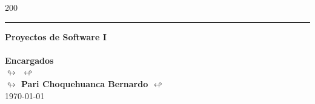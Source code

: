 \begin{titlepage}
\begin{textblock}{200}
\begin{center}
            \textcolor{azul}{\rule{0.5\linewidth}{0.80mm}} \par
            \vspace{4mm}
            
                
                {\large{\textbf{ Proyectos de Software I}}} \\[2pt]
                 {\large{\textbf{\textcolor{azul}{\Precidente }}}} \\[2pt]
                {\large{\textbf{Encargados}}}\\[2pt]
                 {\large{\textbf{$\looparrowright$   \PracticanteNombre  $\looparrowleft$ }}}\\[1pt]
                {\large{\textbf{$\looparrowright$   Pari Choquehuanca Bernardo $\looparrowleft$ }}}\\[1pt]
                \today
        \end{center}
    \end{textblock}
    
\end{titlepage}


